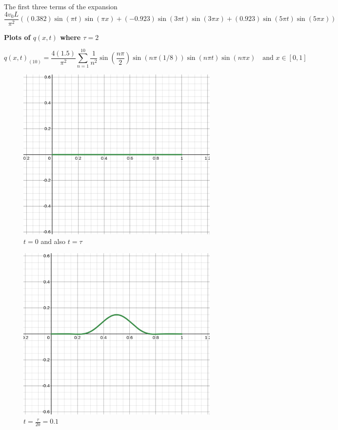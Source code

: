 \documentclass[letter, 10pts]{article}
\begin{document}
The first three terms of the expansion 
\[
\frac{4v_0 L}{\pi^2} \left(
	(0.382)\sin(\pi t)\sin(\pi x) + 
	(-0.923)\sin(3 \pi t) \sin(3 \pi x)+ 
	(0.923) \sin(5 \pi t) \sin(5 \pi x) 
\right)
\] 
\newpage 
\begin{center}
	{\huge \textbf{Plots of $q(x,t)$ where $\tau = 2$ }}
\end{center}
\[
\boxed{
q(x,t)_{(10)} = \frac{4 (1.5)}{\pi ^2} 
\sum_{n=1}^{10} \frac{1}{n^2}
\sin \left( \frac{n \pi }{2}\right) \sin \left({n \pi (1 / 8)}\right) 
\sin \left( n \pi t\right) \sin \left(n \pi x\right)
\quad \text{and } x \in [0,1]
}\]
\begin{minipage}{0.5\textwidth}
\begin{figure}[H]
	\centering
	\includegraphics[width=0.9\textwidth]{../phys311/ss/d_n_03.png}
	\caption{$t = 0$ and also $t = \tau$}
	\label{fig:ss-c_n_001-png}
\end{figure}
\begin{figure}[H]
	\centering
	\includegraphics[width=0.9\textwidth]{../phys311/ss/d_n_025.png}
	\caption{$t = \frac{\tau}{20} = 0.1 $}
	\label{fig:ss-c_n_01-png}
\end{figure}
\end{minipage}
\end{document}
